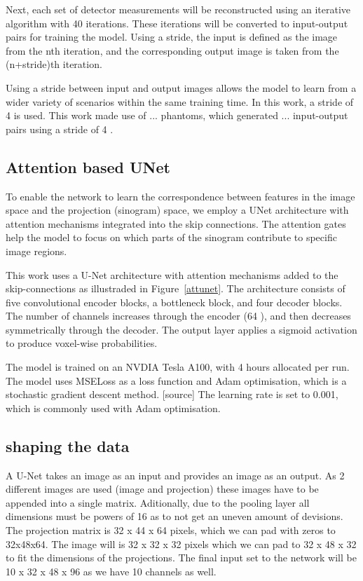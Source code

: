 \documentclass{article}
\begin{document}
Next, each set of detector measurements will be reconstructed using an iterative algorithm with 40 iterations. These iterations will be converted to input-output pairs for training the model. Using a stride, the input is defined as the image from the nth iteration, and the corresponding output image is taken from the (n+stride)th iteration.

Using a stride between input and output images allows the model to learn from a wider variety of scenarios within the same training time. In this work, a stride of 4 is used. This work made use of ... phantoms, which generated ... input-output pairs using a stride of 4 .

\subsection{Attention based UNet}

To enable the network to learn the correspondence between features in the image space and the projection (sinogram) space, we employ a UNet architecture with attention mechanisms integrated into the skip connections. The attention gates help the model to focus on which parts of the sinogram contribute to specific image regions.

This work uses a U-Net architecture with attention mechanisms added to the skip-connections as illustraded in Figure~\ref{attunet}. The architecture consists of five convolutional encoder blocks, a bottleneck block, and four decoder blocks. The number of channels increases through the encoder (64    ), and then decreases symmetrically through the decoder. The output layer applies a sigmoid activation to produce voxel-wise probabilities.

The model is trained on an NVDIA Tesla A100, with 4 hours allocated per run. The model uses MSELoss as a loss function and Adam optimisation, which is a stochastic gradient descent method. [source] The learning rate is set to 0.001, which is commonly used with Adam optimisation.

\subsection{shaping the data}

A U-Net takes an image as an input and provides an image as an output. As 2 different images are used (image and projection) these images have to be appended into a single matrix. Aditionally, due to the pooling layer all dimensions must be powers of 16 as to not get an uneven amount of devisions. The projection matrix is 32 x 44 x 64 pixels, which we can pad with zeros to 32x48x64. The image will is 32 x 32 x 32 pixels which we can pad to 32 x 48 x 32 to fit the dimensions of the projections. The final input set to the network will be 10 x 32 x 48 x 96 as we have 10 channels as well.
\end{document}
